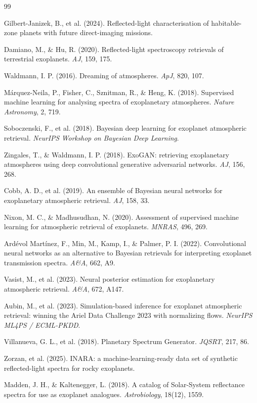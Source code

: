 \documentclass[11pt,twocolumn]{article}
\begin{document}
\begin{thebibliography}{99}
\small

 Gilbert-Janizek, B., et al. (2024). Reflected-light
characterisation of habitable-zone planets with future direct-imaging missions.

 Damiano, M., \& Hu, R. (2020). Reflected-light spectroscopy
retrievals of terrestrial exoplanets. \textit{AJ}, 159, 175.

 Waldmann, I. P. (2016). Dreaming of atmospheres.
\textit{ApJ}, 820, 107.

 M\'arquez-Neila, P., Fisher, C., Sznitman, R., \&
Heng, K. (2018). Supervised machine learning for analysing spectra of exoplanetary
atmospheres. \textit{Nature Astronomy}, 2, 719.

 Soboczenski, F., et al. (2018). Bayesian deep learning
for exoplanet atmospheric retrieval. \textit{NeurIPS Workshop on Bayesian Deep
Learning}.

 Zingales, T., \& Waldmann, I. P. (2018). ExoGAN:
retrieving exoplanetary atmospheres using deep convolutional generative
adversarial networks. \textit{AJ}, 156, 268.

 Cobb, A. D., et al. (2019). An ensemble of Bayesian neural
networks for exoplanetary atmospheric retrieval. \textit{AJ}, 158, 33.

 Nixon, M. C., \& Madhusudhan, N. (2020). Assessment of
supervised machine learning for atmospheric retrieval of exoplanets.
\textit{MNRAS}, 496, 269.

 Ard\'evol Mart\'inez, F., Min, M., Kamp, I., \&
Palmer, P. I. (2022). Convolutional neural networks as an alternative to Bayesian
retrievals for interpreting exoplanet transmission spectra. \textit{A\&A}, 662,
A9.

 Vasist, M., et al. (2023). Neural posterior estimation for
exoplanetary atmospheric retrieval. \textit{A\&A}, 672, A147.

 Aubin, M., et al. (2023). Simulation-based inference for
exoplanet atmospheric retrieval: winning the Ariel Data Challenge 2023 with
normalizing flows. \textit{NeurIPS ML4PS / ECML-PKDD}.

 Villanueva, G. L., et al. (2018). Planetary Spectrum
Generator. \textit{JQSRT}, 217, 86.

 Zorzan, et al. (2025). INARA: a machine-learning-ready data
set of synthetic reflected-light spectra for rocky exoplanets.

 Madden, J. H., \& Kaltenegger, L. (2018). A catalog of
Solar-System reflectance spectra for use as exoplanet analogues.
\textit{Astrobiology}, 18(12), 1559.

\end{thebibliography}
\end{document}
